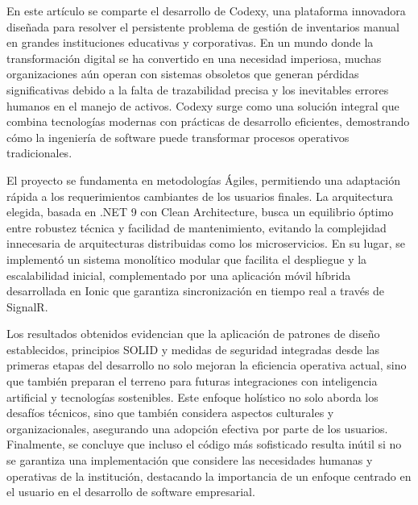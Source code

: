 En este artículo se comparte el desarrollo de Codexy, una plataforma innovadora diseñada para resolver el persistente problema de gestión de inventarios manual en grandes instituciones educativas y corporativas. En un mundo donde la transformación digital se ha convertido en una necesidad imperiosa, muchas organizaciones aún operan con sistemas obsoletos que generan pérdidas significativas debido a la falta de trazabilidad precisa y los inevitables errores humanos en el manejo de activos. Codexy surge como una solución integral que combina tecnologías modernas con prácticas de desarrollo eficientes, demostrando cómo la ingeniería de software puede transformar procesos operativos tradicionales.

El proyecto se fundamenta en metodologías Ágiles, permitiendo una adaptación rápida a los requerimientos cambiantes de los usuarios finales. La arquitectura elegida, basada en .NET 9 con Clean Architecture, busca un equilibrio óptimo entre robustez técnica y facilidad de mantenimiento, evitando la complejidad innecesaria de arquitecturas distribuidas como los microservicios. En su lugar, se implementó un sistema monolítico modular que facilita el despliegue y la escalabilidad inicial, complementado por una aplicación móvil híbrida desarrollada en Ionic que garantiza sincronización en tiempo real a través de SignalR.

Los resultados obtenidos evidencian que la aplicación de patrones de diseño establecidos, principios SOLID y medidas de seguridad integradas desde las primeras etapas del desarrollo no solo mejoran la eficiencia operativa actual, sino que también preparan el terreno para futuras integraciones con inteligencia artificial y tecnologías sostenibles. Este enfoque holístico no solo aborda los desafíos técnicos, sino que también considera aspectos culturales y organizacionales, asegurando una adopción efectiva por parte de los usuarios. Finalmente, se concluye que incluso el código más sofisticado resulta inútil si no se garantiza una implementación que considere las necesidades humanas y operativas de la institución, destacando la importancia de un enfoque centrado en el usuario en el desarrollo de software empresarial.